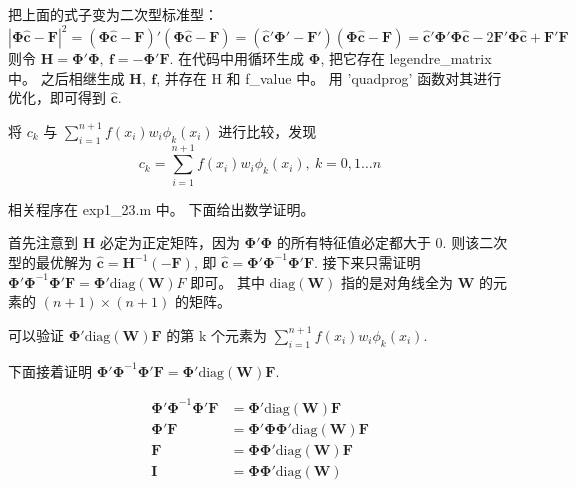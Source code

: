 \documentclass[11pt]{ctexart}
\begin{document}
    把上面的式子变为二次型标准型：
    \begin{equation}
        |\mathbf{\Phi} \mathbf{\hat{c}}-\mathbf F|^2=(\mathbf{\Phi} \mathbf {\hat{c}}-\mathbf F)'(\mathbf{\Phi} \mathbf {\hat{c}}-\mathbf F)=
        (\mathbf{\hat{c}}'\mathbf{\Phi}'-\mathbf{F}')(\mathbf{\Phi} \mathbf {\hat{c}}-\mathbf F)=
        \mathbf{\hat{c}}'\mathbf{\Phi}'\mathbf{\Phi}\mathbf{\hat{c}}-2\mathbf{F}'\mathbf{\Phi}\mathbf{\hat{c}}+\mathbf{F}'\mathbf{F}
    \end{equation}
    则令 \(\mathbf{H}=\mathbf{\Phi'\Phi},\ \mathbf{f}=-\mathbf{\Phi' F}\).
    在代码中用循环生成 \(\mathbf{\Phi}\), 把它存在 legendre\_matrix 中。
    之后相继生成 \(\mathbf{H},\ \mathbf{f}\), 并存在 H 和 f\_value 中。
    用 'quadprog' 函数对其进行优化，即可得到 \(\mathbf{\hat{c}}\).

    将 \(c_k\) 与 \(\sum_{i=1}^{n+1}f\left(x_{i}\right) w_{i} \phi_{k}\left(x_{i}\right)\) 进行比较，发现
    \begin{equation}
        c_k=\sum_{i=1}^{n+1}f\left(x_{i}\right) w_{i} \phi_{k}\left(x_{i}\right),\ k=0,1\dots n
    \end{equation}

    相关程序在 exp1\_23.m 中。
    下面给出数学证明。

    首先注意到 \(\mathbf{H}\) 必定为正定矩阵，因为 \(\mathbf{\Phi'\Phi}\) 的所有特征值必定都大于 0.
    则该二次型的最优解为 \(\mathbf{\hat{c}}=\mathbf{H}^{-1}\mathbf{(-F)}\), 即 \(\mathbf{\hat{c}}=\mathbf{\Phi'\Phi}^{-1}\mathbf{\Phi' F}\).
    接下来只需证明 \(\mathbf{\Phi'\Phi}^{-1}\mathbf{\Phi' F}=\mathbf{\Phi'}\text{diag}(\mathbf{W})F\) 即可。
    其中 \(\text{diag}(\mathbf{W})\) 指的是对角线全为 \(\mathbf{W}\) 的元素的 \((n+1)\times (n+1)\) 的矩阵。

    可以验证 \(\mathbf{\Phi'}\text{diag}(\mathbf{W})\mathbf{F}\) 的第 k 个元素为 \(\sum_{i=1}^{n+1}f\left(x_{i}\right) w_{i} \phi_{k}\left(x_{i}\right)\).

    下面接着证明 \(\mathbf{\Phi'\Phi}^{-1}\mathbf{\Phi' F}=\mathbf{\Phi'}\text{diag}(\mathbf{W})\mathbf{F}\).

    \begin{equation}
        \begin{aligned}
            \mathbf{\Phi'\Phi}^{-1}\mathbf{\Phi' F} &=\mathbf{\Phi'}\text{diag}(\mathbf{W})\mathbf{F} \\
            \mathbf{\Phi' F} &=\mathbf{\Phi'\Phi}\mathbf{\Phi'}\text{diag}(\mathbf{W})\mathbf{F} \\
            \mathbf{F} &=\mathbf{\Phi}\mathbf{\Phi'}\text{diag}(\mathbf{W})\mathbf{F} \\
            \mathbf{I} &=\mathbf{\Phi}\mathbf{\Phi'}\text{diag}(\mathbf{W})
        \end{aligned}
    \end{equation}
\end{document}
